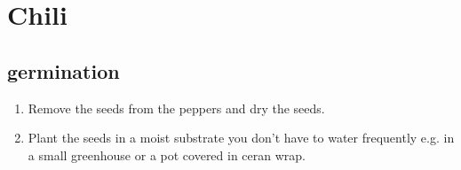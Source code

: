 \section{Chili}

\subsection{germination}

\begin{enumerate}
\item Remove the seeds from the peppers and dry the seeds.
\item Plant the seeds in a moist substrate you don't have to water frequently e.g. in a small greenhouse or a pot covered in ceran wrap.
\end{enumerate}
